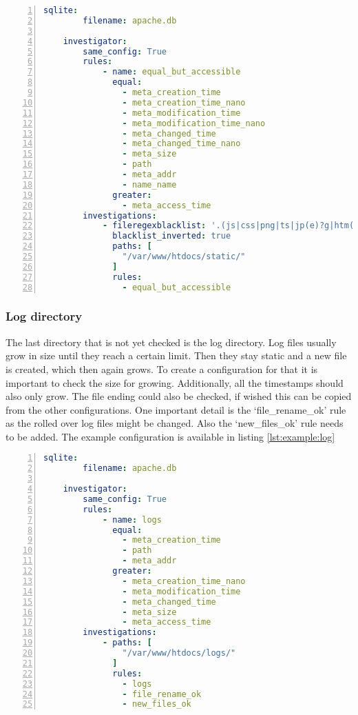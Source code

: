 \begin{lstlisting}[language=yaml, numbers=left, caption=Scanner Configuration, label=lst:example:static]
    sqlite:
        filename: apache.db
    
    investigator:
        same_config: True
        rules: 
            - name: equal_but_accessible
              equal:
                - meta_creation_time
                - meta_creation_time_nano
                - meta_modification_time
                - meta_modification_time_nano
                - meta_changed_time
                - meta_changed_time_nano
                - meta_size
                - path
                - meta_addr
                - name_name
              greater:
                - meta_access_time
        investigations:
            - fileregexblacklist: '.(js|css|png|ts|jp(e)?g|htm(l)?)$'
              blacklist_inverted: true
              paths: [
                "/var/www/htdocs/static/"
              ]
              rules:
                - equal_but_accessible

\end{lstlisting}

\subsubsection{Log directory}

The last directory that is not yet checked is the log directory. Log files usually grow in size until they reach a certain limit. Then they stay static and a new file is created, which then again grows. To create a configuration for that it is important to check the size for growing. Additionally, all the timestamps should also only grow. The file ending could also be checked, if wished this can be copied from the other configurations. One important detail is the `file\_rename\_ok' rule as the rolled over log files might be changed. Also the `new\_files\_ok' rule needs to be added. The example configuration is available in listing \ref{lst:example:log}

\begin{lstlisting}[language=yaml, numbers=left, caption=Scanner Configuration, label=lst:example:log]
    sqlite:
        filename: apache.db
    
    investigator:
        same_config: True
        rules: 
            - name: logs
              equal:
                - meta_creation_time
                - path
                - meta_addr
              greater:
                - meta_creation_time_nano
                - meta_modification_time
                - meta_changed_time
                - meta_size
                - meta_access_time
        investigations:
            - paths: [
                "/var/www/htdocs/logs/"
              ]
              rules:
                - logs
                - file_rename_ok
                - new_files_ok

\end{lstlisting}

